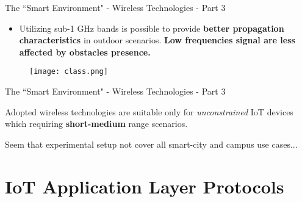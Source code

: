 \documentclass[13.5pt]{beamer}
\begin{document}
\begin{frame}{The ``Smart Environment" - Wireless Technologies - Part 3}

\begin{itemize}
\justifying

\item Utilizing sub-1 GHz bands is possible to provide \textbf{better  propagation characteristics} in outdoor scenarios. \textbf{Low frequencies signal are less affected by obstacles presence.}
\end{itemize}

\begin{figure}
  \texttt{[image: class.png]}
\end{figure}


\end{frame} 
\begin{frame}{The ``Smart Environment" - Wireless Technologies - Part 3}

\begin{block}{}
\justifying
Adopted wireless technologies are suitable only for \textit{unconstrained} IoT devices which requiring \textbf{short-medium} range scenarios. 

Seem that experimental setup not cover all smart-city and campus use cases...
\end{block}

\end{frame} 

\section{IoT Application Layer Protocols}
\end{document}
